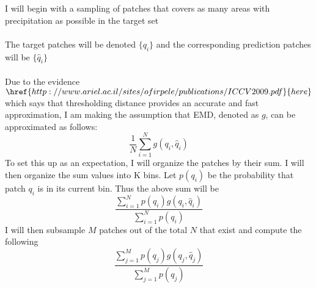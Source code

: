 \documentclass[twoside,11pt]{article}
\theoremstyle{definition}
\begin{document}
I will begin with a sampling of patches that covers as many areas with precipitation as possible in the target set\\
\\
The target patches will be denoted $\{q_i\}$ and the corresponding prediction patches will be $\{\hat{q}_i\}$\\
\\
Due to the evidence $\href{http://www.ariel.ac.il/sites/ofirpele/publications/ICCV2009.pdf}{here}$ which says that thresholding distance provides an accurate and fast approximation, I am making the assumption that EMD, denoted as $g$, can be approximated as follows:
\[
\frac{1}{N} \sum_{i=1}^N{g(q_i,\hat{q}_i)}
\]
To set this up as an expectation, I will organize the patches by their sum. I will then organize the sum values into K bins. Let $p(q_i)$ be the probability that patch $q_i$ is in its current bin. Thus the above sum will be
\[
\frac{\sum_{i=1}^N{p(q_i) g(q_i,\hat{q}_i)}}{\sum_{i=1}^N{p(q_i)}} 
\]
I will then subsample $M$ patches out of the total $N$ that exist and compute the following
\[
\frac{\sum_{j=1}^M{p(q_j) g(q_j,\hat{q}_j)}}{\sum_{j=1}^M{p(q_j)}} 
\]
\end{document}
